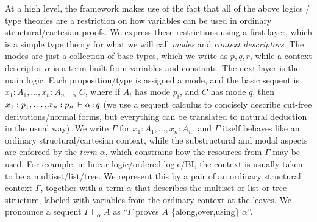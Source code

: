 \documentclass[a4paper,USenglish,numberwithinsect]{lipics-v2016}
\newcommand\seq[3]{\ensuremath{#1 \vdash_{#2} #3}}
\renewcommand{\oftp}[3]{\ensuremath{#1 \, \vdash #2 \, \dcd{:} \, #3}}
\begin{document}
At a high level, the framework makes use of the fact that all of the
above logics / type theories are a restriction on how variables can be
used in ordinary structural/cartesian proofs.  We express these
restrictions using a first layer, which is a simple type theory for what
we will call \emph{modes} and \emph{context descriptors}.  The modes are
just a collection of base types, which we write as $p,q,r$, while a
context descriptor $\alpha$ is a term built from variables and
constants.  The next layer is the main logic.  Each proposition/type is
assigned a mode, and the basic sequent is \seq{x_1 : A_1, \ldots, x_n :
  A_n}{\alpha}{C}, where if $A_i$ has mode $p_i$, and $C$ has mode $q$,
then $\oftp{x_1 : p_1,\ldots, x_n : p_n}{\alpha}{q}$ (we use a sequent
calculus to concisely describe cut-free derivations/normal forms, but
everything can be translated to natural deduction in the usual way).  We
write ${\Gamma}$ for $x_1 : A_1, \ldots, x_n : A_n$, and $\Gamma$ itself
behaves like an ordinary structural/cartesian context, while the
substructural and modal aspects are enforced by the \emph{term}
$\alpha$, which constrains how the resources from $\Gamma$ may be used.
For example, in linear logic/ordered logic/BI, the context is usually
taken to be a multiset/list/tree.  We represent this by a pair of an
ordinary structural context $\Gamma$, together with a term $\alpha$ that
describes the multiset or list or tree structure, labeled with variables
from the ordinary context at the leaves.  We pronounce a sequent
\seq{\Gamma}{\alpha}{A} as ``$\Gamma$ proves $A$ \{along,over,using\}
$\alpha$''.
\end{document}
